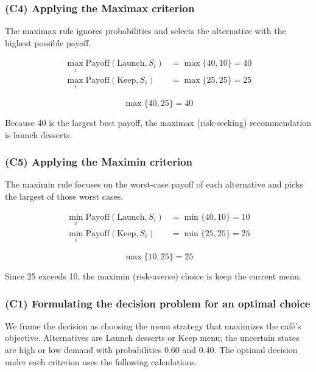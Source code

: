 \subsubsection{(C4) Applying the Maximax criterion}\label{subsubsec:practice-activity-1-solution-1-c4}

The maximax rule ignores probabilities and selects the alternative with the highest possible payoff.

\[
\begin{aligned}
\max_i \text{Payoff}(\text{Launch}, S_i) &= \max\{40, 10\} = 40\\
\max_i \text{Payoff}(\text{Keep}, S_i) &= \max\{25, 25\} = 25
\end{aligned}
\]

\[
\max\{40, 25\} = 40
\]

Because 40 is the largest best payoff, the maximax (risk-seeking) recommendation is launch desserts.

\subsubsection{(C5) Applying the Maximin criterion}\label{subsubsec:practice-activity-1-solution-1-c5}

The maximin rule focuses on the worst-case payoff of each alternative and picks the largest of those worst cases.

\[
\begin{aligned}
\min_i \text{Payoff}(\text{Launch}, S_i) &= \min\{40, 10\} = 10\\
\min_i \text{Payoff}(\text{Keep}, S_i) &= \min\{25, 25\} = 25
\end{aligned}
\]

\[
\max\{10, 25\} = 25
\]

Since 25 exceeds 10, the maximin (risk-averse) choice is keep the current menu.

\subsubsection{(C1) Formulating the decision problem for an optimal choice}\label{subsubsec:practice-activity-1-solution-1-c1}

We frame the decision as choosing the menu strategy that maximizes the café's objective. Alternatives are
Launch desserts or Keep menu; the uncertain states are high or low demand with
probabilities 0.60 and 0.40. The optimal decision under each criterion uses the following calculations.

